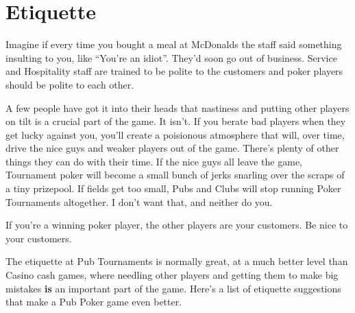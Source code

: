 \chapter{Etiquette}


Imagine if every time you bought a meal at McDonalds the staff
said something insulting to you, like ``You're an idiot''. They'd
soon go out of business. Service and Hospitality staff are trained
to be polite to the customers and poker players should be polite to
each other.

A few people have got it into their heads that nastiness
and putting other players on tilt is a crucial part of the game.
It isn't. If you berate bad players when they get lucky against
you, you'll create a poisionous atmosphere that will, over time,
drive the nice guys and weaker players out of the game. There's plenty
of other things they can do with their time. If the nice
guys all leave the game, Tournament poker will become a small
bunch of jerks snarling over the scraps of a tiny prizepool.
If fields get too small, Pubs and Clubs will stop running Poker
Tournaments altogether. I don't want that, and neither do you.

If you're a winning poker player, the other players are
your customers. Be nice to your customers.

The etiquette at Pub Tournaments is normally great, at a much
better level than Casino cash games, where needling other players
and getting them to make big mistakes \textbf{is} an important
part of the game. Here's a list of etiquette suggestions that
make a Pub Poker game even better.

